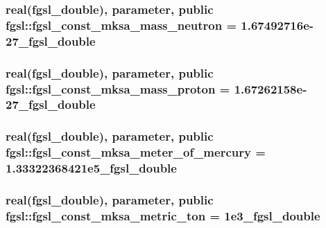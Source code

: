 \subsubsection[{fgsl\+\_\+const\+\_\+mksa\+\_\+mass\+\_\+neutron}]{\setlength{\rightskip}{0pt plus 5cm}real({\bf fgsl\+\_\+double}), parameter, public fgsl\+::fgsl\+\_\+const\+\_\+mksa\+\_\+mass\+\_\+neutron = 1.\+67492716e-\/27\+\_\+fgsl\+\_\+double}\label{namespacefgsl_a4480f5ff7a83600820b4cdaa8aff929e}
\hypertarget{namespacefgsl_a9b4432f549e95747550b45df3417757f}{}
\subsubsection[{fgsl\+\_\+const\+\_\+mksa\+\_\+mass\+\_\+proton}]{\setlength{\rightskip}{0pt plus 5cm}real({\bf fgsl\+\_\+double}), parameter, public fgsl\+::fgsl\+\_\+const\+\_\+mksa\+\_\+mass\+\_\+proton = 1.\+67262158e-\/27\+\_\+fgsl\+\_\+double}\label{namespacefgsl_a9b4432f549e95747550b45df3417757f}
\hypertarget{namespacefgsl_a7f5943b971d1e27da66ed35eb36865a0}{}
\subsubsection[{fgsl\+\_\+const\+\_\+mksa\+\_\+meter\+\_\+of\+\_\+mercury}]{\setlength{\rightskip}{0pt plus 5cm}real({\bf fgsl\+\_\+double}), parameter, public fgsl\+::fgsl\+\_\+const\+\_\+mksa\+\_\+meter\+\_\+of\+\_\+mercury = 1.\+33322368421e5\+\_\+fgsl\+\_\+double}\label{namespacefgsl_a7f5943b971d1e27da66ed35eb36865a0}
\hypertarget{namespacefgsl_a0d771fd3ef9d093957328b9555c6a604}{}
\subsubsection[{fgsl\+\_\+const\+\_\+mksa\+\_\+metric\+\_\+ton}]{\setlength{\rightskip}{0pt plus 5cm}real({\bf fgsl\+\_\+double}), parameter, public fgsl\+::fgsl\+\_\+const\+\_\+mksa\+\_\+metric\+\_\+ton = 1e3\+\_\+fgsl\+\_\+double}\label{namespacefgsl_a0d771fd3ef9d093957328b9555c6a604}
\hypertarget{namespacefgsl_ab0be2229dca10e5128f21a8729ff742b}{}
